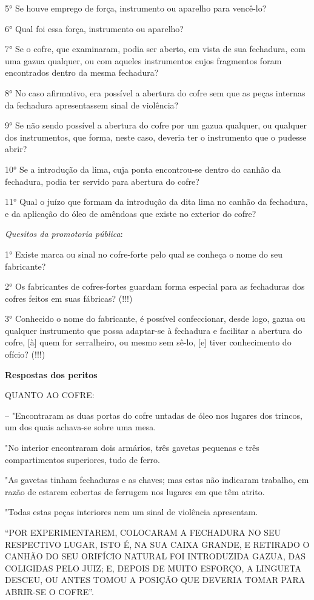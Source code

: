 5° Se houve emprego de força, instrumento ou aparelho para vencê-lo?

6° Qual foi essa força, instrumento ou aparelho?

7° Se o cofre, que examinaram, podia ser aberto, em vista de sua
fechadura, com uma gazua qualquer, ou com aqueles instrumentos cujos
fragmentos foram encontrados dentro da mesma fechadura?

8° No caso afirmativo, era possível a abertura do cofre sem que as peças
internas da fechadura apresentassem sinal de violência?

9° Se não sendo possível a abertura do cofre por um gazua qualquer, ou
qualquer dos instrumentos, que forma, neste caso, deveria ter o
instrumento que o pudesse abrir?

10° Se a introdução da lima, cuja ponta encontrou-se dentro do canhão da
fechadura, podia ter servido para abertura do cofre?

11° Qual o juízo que formam da introdução da dita lima no canhão da
fechadura, e da aplicação do óleo de amêndoas que existe no exterior do
cofre?

\emph{Quesitos da promotoria pública}:

1° Existe marca ou sinal no cofre-forte pelo qual se conheça o nome do
seu fabricante?

2° Os fabricantes de cofres-fortes guardam forma especial para as
fechaduras dos cofres feitos em suas fábricas? (!!!)

3° Conhecido o nome do fabricante, é possível confeccionar, desde logo,
gazua ou qualquer instrumento que possa adaptar-se à fechadura e
facilitar a abertura do cofre, {[}à{]} quem for serralheiro, ou mesmo
sem sê-lo, {[}e{]} tiver conhecimento do ofício? (!!!)

\textbf{Respostas dos peritos}

QUANTO AO COFRE:

-- "Encontraram as duas portas do cofre untadas de óleo nos lugares dos
trincos, um dos quais achava-se sobre uma mesa.

"No interior encontraram dois armários, três gavetas pequenas e três
compartimentos superiores, tudo de ferro.

"As gavetas tinham fechaduras e as chaves; mas estas não indicaram
trabalho, em razão de estarem cobertas de ferrugem nos lugares em que
têm atrito.

"Todas estas peças interiores nem um sinal de violência apresentam.

``POR EXPERIMENTAREM, COLOCARAM A FECHADURA NO SEU RESPECTIVO LUGAR,
ISTO É, NA SUA CAIXA GRANDE, E RETIRADO O CANHÃO DO SEU ORIFÍCIO NATURAL
FOI INTRODUZIDA GAZUA, DAS COLIGIDAS PELO JUIZ; E, DEPOIS DE MUITO
ESFORÇO, A LINGUETA DESCEU, OU ANTES TOMOU A POSIÇÃO QUE DEVERIA TOMAR
PARA ABRIR-SE O COFRE''.

